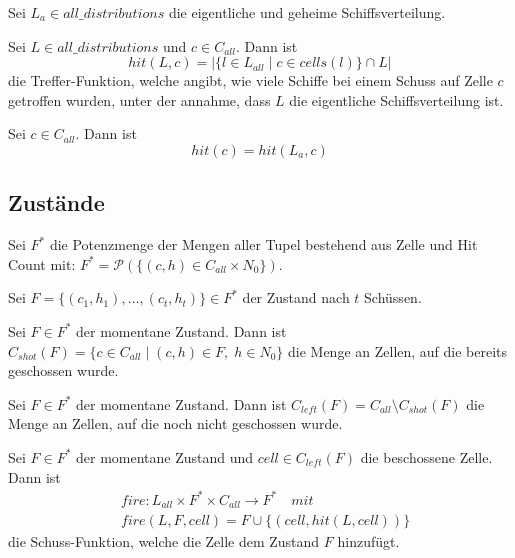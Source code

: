 \documentclass[a4paper,12pt]{llncs}
\numberwithin{equation}{section}
\begin{document}
\begin{definition}
Sei $L_a \in all\_distributions$ die eigentliche und geheime Schiffsverteilung.
\end{definition}

\begin{definition}
Sei $L \in all\_distributions$ und $c \in C_{all}$.
Dann ist 
\[
hit(L, c)=|\{l \in L_{all} \mid c \in cells(l)\} \cap L|
\]
die Treffer-Funktion, welche angibt, wie viele Schiffe bei einem Schuss auf Zelle $c$ getroffen wurden, unter der annahme, dass $L$ die eigentliche Schiffsverteilung ist.
\end{definition}

\begin{definition}
Sei $c \in C_{all}$.
Dann ist 
\[
hit(c)=hit(L_a, c)
\]
\end{definition}

\subsection{Zustände}

\begin{definition}
Sei $F^*$ die Potenzmenge der Mengen aller Tupel bestehend aus Zelle und Hit Count mit:
$F^*=\mathscr{P}(\{(c,h)\in C_{all}\times N_0\})$.
\end{definition}

\begin{definition}
Sei $F=\{(c_1, h_1), \dots , (c_t, h_t)\}\in F^*$ der Zustand nach $t$ Schüssen.
\end{definition}

\begin{definition}
Sei $F\in F^*$ der momentane Zustand.
Dann ist $C_{shot}(F)=\{c \in C_{all} \mid (c,h) \in F, \; h \in N_0\}$ die Menge an Zellen, auf die bereits geschossen wurde.
\end{definition}

\begin{definition}
Sei $F\in F^*$ der momentane Zustand.
Dann ist $C_{left}(F)=C_{all} \setminus C_{shot}(F)$ die Menge an Zellen, auf die noch nicht geschossen wurde.
\end{definition}

\begin{definition}
Sei $F\in F^*$ der momentane Zustand und $cell \in C_{left}(F)$ die beschossene Zelle.
Dann ist
\begin{align}
&fire:L_{all}\times F^*\times C_{all} \rightarrow F^* \quad mit \nonumber\\
&fire(L, F, cell)=F \cup \{(cell,hit(L, cell))\}  \nonumber
\end{align}
die Schuss-Funktion, welche die Zelle dem Zustand $F$ hinzufügt.
\end{definition}
\end{document}
